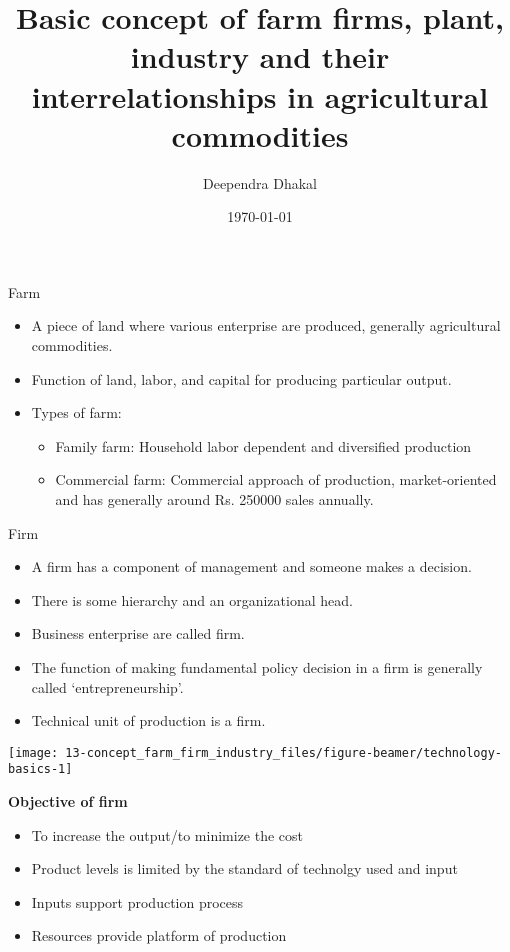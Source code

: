\documentclass[12pt,ignorenonframetext,aspectratio=169]{beamer}
\title{\insertsectionhead}
  {
    \definecolor{white}{rgb}{0.776,0.357,0.157}
    \definecolor{iqss@orange}{rgb}{1,1,1}
    \ifnum \insertmainframenumber > \insertframenumber
    \frame{
      \frametitle{\iqsssectiontitleheader}
      \tableofcontents[currentsection]
    }
    \else
    \frame{
      \frametitle{Backup Slides}
      \tableofcontents[sectionstyle=shaded/shaded,subsectionstyle=shaded/shaded/shaded]
    }
    \fi
  }
\title[]{Basic concept of farm firms, plant, industry and their
interrelationships in agricultural commodities}
\author[
        Deependra Dhakal
    ]{Deependra Dhakal}
\institute[
    ]{
    GAASC, Baitadi \and Tribhuwan University
    }
\date[
      \today
  ]{
      \today
        }
\providecommand{\tightlist}{%
  \setlength{\itemsep}{0pt}\setlength{\parskip}{0pt}}
\begin{document}
  \begin{frame}[plain]
  \titlepage
  \end{frame}



\begin{frame}{Farm}
\protect\hypertarget{farm}{}
\begin{itemize}
\tightlist
\item
  A piece of land where various enterprise are produced, generally
  agricultural commodities.
\item
  Function of land, labor, and capital for producing particular output.
\item
  Types of farm:

  \begin{itemize}
  \tightlist
  \item
    Family farm: Household labor dependent and diversified production
  \item
    Commercial farm: Commercial approach of production, market-oriented
    and has generally around Rs. 250000 sales annually.
  \end{itemize}
\end{itemize}
\end{frame}

\begin{frame}{Firm}
\protect\hypertarget{firm}{}
\begin{itemize}
\tightlist
\item
  A firm has a component of management and someone makes a decision.
\item
  There is some hierarchy and an organizational head.
\item
  Business enterprise are called firm.
\item
  The function of making fundamental policy decision in a firm is
  generally called `entrepreneurship'.
\item
  Technical unit of production is a firm.
\end{itemize}
\end{frame}

\begin{frame}{}
\protect\hypertarget{section}{}
\texttt{[image: 13-concept\_farm\_firm\_industry\_files/figure-beamer/technology-basics-1]}
\end{frame}

\begin{frame}{}
\protect\hypertarget{section-1}{}
\textbf{Objective of firm}

\begin{itemize}
\tightlist
\item
  To increase the output/to minimize the cost
\item
  Product levels is limited by the standard of technolgy used and input
\item
  Inputs support production process
\item
  Resources provide platform of production
\end{itemize}
\end{frame}
\end{document}
